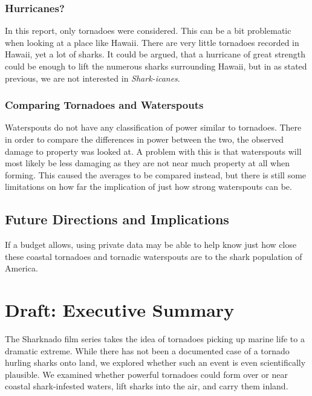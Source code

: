 \documentclass[
  letterpaper,
  DIV=11,
  numbers=noendperiod]{scrreprt}
\begin{document}
\subsection{Hurricanes?}\label{hurricanes}

In this report, only tornadoes were considered. This can be a bit
problematic when looking at a place like Hawaii. There are very little
tornadoes recorded in Hawaii, yet a lot of sharks. It could be argued,
that a hurricane of great strength could be enough to lift the numerous
sharks surrounding Hawaii, but in as stated previous, we are not
interested in \emph{Shark-icanes}.

\subsection{Comparing Tornadoes and
Waterspouts}\label{comparing-tornadoes-and-waterspouts}

Waterspouts do not have any classification of power similar to
tornadoes. There in order to compare the differences in power between
the two, the observed damage to property was looked at. A problem with
this is that waterspouts will most likely be less damaging as they are
not near much property at all when forming. This caused the averages to
be compared instead, but there is still some limitations on how far the
implication of just how strong waterspouts can be.

\section{Future Directions and
Implications}\label{future-directions-and-implications}

If a budget allows, using private data may be able to help know just how
close these coastal tornadoes and tornadic waterspouts are to the shark
population of America.

\chapter{Draft: Executive Summary}\label{draft-executive-summary}

The Sharknado film series takes the idea of tornadoes picking up marine
life to a dramatic extreme. While there has not been a documented case
of a tornado hurling sharks onto land, we explored whether such an event
is even scientifically plausible. We examined whether powerful tornadoes
could form over or near coastal shark-infested waters, lift sharks into
the air, and carry them inland.
\end{document}
